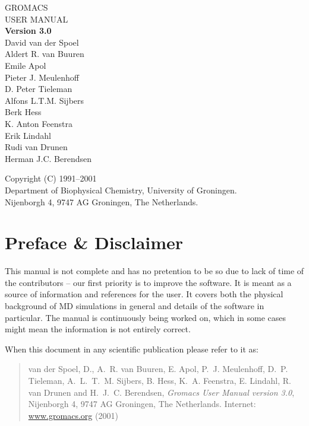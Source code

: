 \documentclass[11pt,a4paper,twoside]{gmxmanual}
\newcommand{\gmxver}{3.0}
\newcommand{\wwwpage}{\href{http://www.gromacs.org}{www.gromacs.org}}
\begin{document}
\begin{center}
\phantom{ }
\vspace{1cm}
{\fontsize{40}{50} \selectfont 
GROMACS\\
USER MANUAL\\[1cm]
}
{\LARGE\bf Version \gmxver}\\[1cm]
{\Large 
David van der Spoel     \\
Aldert R. van Buuren    \\
Emile Apol              \\
Pieter J. Meulenhoff    \\
D. Peter Tieleman       \\
Alfons L.T.M. Sijbers   \\
Berk Hess               \\
K. Anton Feenstra       \\
Erik Lindahl            \\
Rudi van Drunen         \\
Herman J.C. Berendsen \\
}
\end{center}

\vfill

{\center
Copyright (C) 1991--2001  \\
Department of Biophysical Chemistry, University of Groningen. \\
Nijenborgh 4, 9747 AG Groningen, The Netherlands.\\
}

\newpage
\pagestyle{fancyplain}

\section*{Preface \& Disclaimer}
This manual is not complete and has no pretention to be so due
to lack of time of the contributors -- our first priority is to improve
the software. It is meant as a source of
information and references for the {\gromacs} user.  It covers both the
physical background of MD simulations in general and details of 
the {\gromacs} software in particular. The manual is 
continuously being worked on,
which in some cases might mean the information is not entirely correct.

When  this document in any scientific publication
please refer to it as:

\begin{quote}
\raggedright
van der Spoel, D., A.~R. van Buuren, E. Apol, P.~J. Meulenhoff, D.~P.
Tieleman, A.~L.~T.~M. Sij\-bers, B. Hess, K.~A. Feenstra, E. Lindahl,
R. van Drunen and H.~J.~C. Berendsen,
\hspace{0.3em} {\em Gromacs {U}ser {M}anual version \gmxver},
\hspace{0.3em} Nij\-enborgh 4, 9747 AG Groningen, The Netherlands.
Internet: {\wwwpage} (2001)
\end{quote}
\end{document}
